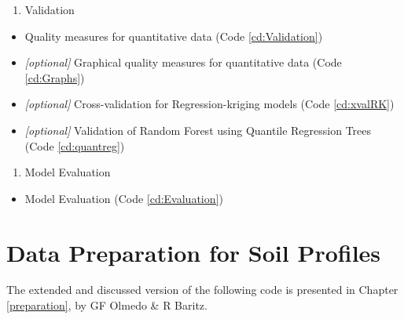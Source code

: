 \documentclass[10pt,b5paper,]{book}
\providecommand{\tightlist}{%
  \setlength{\itemsep}{0pt}\setlength{\parskip}{0pt}}
\theoremstyle{definition}
\theoremstyle{definition}
\theoremstyle{definition}
\theoremstyle{remark}
\begin{document}
\begin{enumerate}
\def\labelenumi{\arabic{enumi}.}
\setcounter{enumi}{3}
\tightlist
\item
  Validation
\end{enumerate}

\begin{itemize}
\tightlist
\item
  Quality measures for quantitative data (Code \ref{cd:Validation})
\item
  \emph{{[}optional{]}} Graphical quality measures for quantitative data
  (Code \ref{cd:Graphs})
\item
  \emph{{[}optional{]}} Cross-validation for Regression-kriging models
  (Code \ref{cd:xvalRK})
\item
  \emph{{[}optional{]}} Validation of Random Forest using Quantile
  Regression Trees (Code \ref{cd:quantreg})
\end{itemize}

\begin{enumerate}
\def\labelenumi{\arabic{enumi}.}
\setcounter{enumi}{4}
\tightlist
\item
  Model Evaluation
\end{enumerate}

\begin{itemize}
\tightlist
\item
  Model Evaluation (Code \ref{cd:Evaluation})
\end{itemize}

\clearpage

\hypertarget{cd:PreparationProfiles}{%
\section{Data Preparation for Soil
Profiles}\label{cd:PreparationProfiles}}

The extended and discussed version of the following code is presented in
Chapter \ref{preparation}, by GF Olmedo \& R Baritz.
\end{document}
